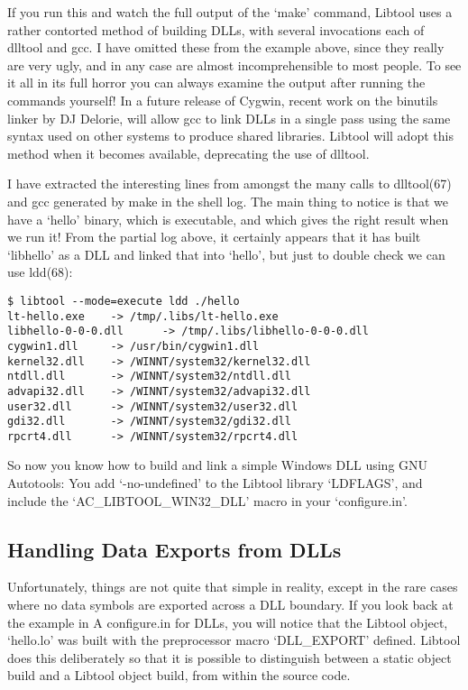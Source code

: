 If you run this and watch the full output of the `make' command, Libtool uses a rather contorted method of building DLLs, with several invocations each of dlltool and gcc. I have omitted these from the example above, since they really are very ugly, and in any case are almost incomprehensible to most people. To see it all in its full horror you can always examine the output after running the commands yourself! In a future release of Cygwin, recent work on the binutils linker by DJ Delorie, will allow gcc to link DLLs in a single pass using the same syntax used on other systems to produce shared libraries. Libtool will adopt this method when it becomes available, deprecating the use of dlltool.

I have extracted the interesting lines from amongst the many calls to dlltool(67) and gcc generated by make in the shell log. The main thing to notice is that we have a `hello' binary, which is executable, and which gives the right result when we run it! From the partial log above, it certainly appears that it has built `libhello' as a DLL and linked that into `hello', but just to double check we can use ldd(68): 

\begin{verbatim}
$ libtool --mode=execute ldd ./hello
lt-hello.exe    -> /tmp/.libs/lt-hello.exe
libhello-0-0-0.dll      -> /tmp/.libs/libhello-0-0-0.dll
cygwin1.dll     -> /usr/bin/cygwin1.dll
kernel32.dll    -> /WINNT/system32/kernel32.dll
ntdll.dll       -> /WINNT/system32/ntdll.dll
advapi32.dll    -> /WINNT/system32/advapi32.dll
user32.dll      -> /WINNT/system32/user32.dll
gdi32.dll       -> /WINNT/system32/gdi32.dll
rpcrt4.dll      -> /WINNT/system32/rpcrt4.dll
\end{verbatim}

So now you know how to build and link a simple Windows DLL using GNU 
Autotools: You add `-no-undefined' to the Libtool library `LDFLAGS', and 
include the `AC\_{}LIBTOOL\_{}WIN32\_{}DLL' macro in your `configure.in'.

\subsection{Handling Data Exports from DLLs}

Unfortunately, things are not quite that simple in reality, except in the rare cases where no data symbols are exported across a DLL boundary. If you look back at the example in A configure.in for DLLs, you will notice that the Libtool object, `hello.lo' was built with the preprocessor macro `DLL\_{}EXPORT' defined. Libtool does this deliberately so that it is possible to distinguish between a static object build and a Libtool object build, from within the source code.

